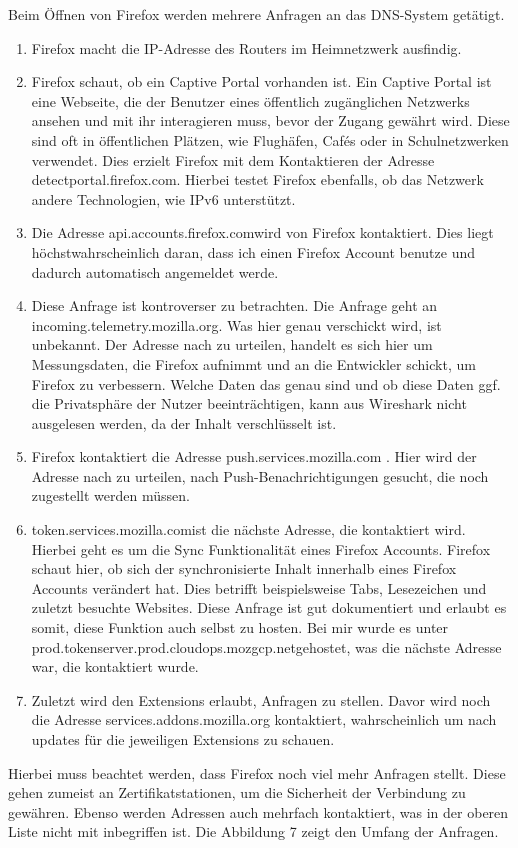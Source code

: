 \documentclass[12pt]{article}
\begin{document}
Beim Öffnen  von Firefox werden mehrere Anfragen an das DNS-System getätigt. 
\begin{enumerate}
	\item Firefox macht die IP-Adresse des Routers im Heimnetzwerk ausfindig. 
	\item Firefox schaut, ob ein Captive Portal vorhanden ist. \glqq Ein Captive Portal ist eine Webseite, die der Benutzer eines öffentlich zugänglichen Netzwerks ansehen und mit ihr interagieren muss, bevor der Zugang gewährt wird.\grqq\cite{captiveportal-computerweekly} Diese sind oft in öffentlichen Plätzen, wie Flughäfen, Cafés oder in Schulnetzwerken verwendet. Dies erzielt Firefox mit dem Kontaktieren der Adresse \glq detectportal.firefox.com\grq. Hierbei testet Firefox ebenfalls, ob das Netzwerk andere Technologien,  wie IPv6 unterstützt.\cite{captiveportal-firefox}
	\item Die Adresse \glq api.accounts.firefox.com\grq wird von Firefox kontaktiert. Dies liegt höchstwahrscheinlich daran, dass ich einen Firefox Account benutze und dadurch automatisch angemeldet werde.
	\item Diese Anfrage ist kontroverser zu betrachten. Die Anfrage geht an \glq incoming.telemetry.mozilla.org\grq. Was hier genau verschickt wird, ist unbekannt. Der Adresse nach zu urteilen, handelt es sich hier um Messungsdaten, die Firefox aufnimmt und an die Entwickler schickt, um Firefox zu verbessern. Welche Daten das genau sind und ob diese Daten ggf. die Privatsphäre der Nutzer beeinträchtigen, kann aus Wireshark nicht ausgelesen werden, da der Inhalt verschlüsselt ist.
	\item Firefox kontaktiert die Adresse \glq push.services.mozilla.com \grq. Hier wird der Adresse nach zu urteilen, nach Push-Benachrichtigungen gesucht, die noch zugestellt werden müssen. 
	\item \glq token.services.mozilla.com\grq ist die nächste Adresse, die kontaktiert wird. Hierbei geht es um die Sync Funktionalität eines Firefox Accounts. Firefox schaut hier, ob sich der synchronisierte Inhalt innerhalb eines Firefox Accounts verändert hat. Dies betrifft beispielsweise Tabs, Lesezeichen und zuletzt besuchte Websites. Diese Anfrage ist gut dokumentiert und erlaubt es somit, diese Funktion auch selbst zu hosten.\cite{syncstorage-firefox} Bei mir wurde es unter \glq prod.tokenserver.prod.cloudops.mozgcp.net\grq gehostet, was die nächste Adresse war, die kontaktiert wurde.
	\item Zuletzt wird den Extensions erlaubt, Anfragen zu stellen. Davor wird noch die Adresse \glq services.addons.mozilla.org \grq kontaktiert, wahrscheinlich um nach updates für die jeweiligen Extensions zu schauen.
\end{enumerate}
\newpage
	Hierbei muss beachtet werden, dass Firefox noch viel mehr Anfragen stellt. Diese gehen zumeist an Zertifikatstationen, um die Sicherheit der Verbindung zu gewähren. Ebenso werden Adressen auch mehrfach kontaktiert, was in der oberen Liste nicht mit inbegriffen ist. Die Abbildung 7 zeigt den Umfang der Anfragen.
	
\end{document}
